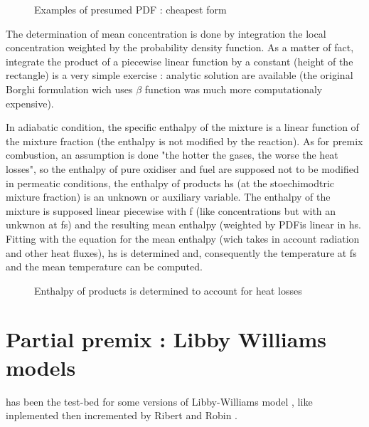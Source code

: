 \begin{figure}[h]
\caption{Examples of presumed PDF : cheapest form}
\end{figure}
The determination of mean concentration is done by integration the
local concentration weighted by the probability density function. As a
matter of fact, integrate the product of a piecewise linear function
by a constant ({\small height of the rectangle}) is a very simple
exercise : analytic solution are available ({\small the original
Borghi formulation \cite{3} wich uses $\beta$ function was much more
computationaly expensive}).

In adiabatic condition, the specific enthalpy of the mixture is a
linear function of the mixture fraction ({\small the enthalpy is not
modified by the reaction}). As for premix combustion, an assumption is
done "the hotter the gases, the worse the heat losses", so the
enthalpy of pure oxidiser and fuel are supposed not to be modified in
permeatic conditions, the enthalpy of products hs ({\small at the
stoechimodtric mixture fraction}) is an unknown or auxiliary
variable. The enthalpy of the mixture is supposed linear piecewise
with f ({\small like concentrations but with an unkwnon at fs}) and
the resulting mean enthalpy ({\small weighted by PDF}is linear in
hs. Fitting with the equation for the mean enthalpy ({\small wich
takes in account radiation and other heat fluxes}), hs is determined
and, consequently the temperature at fs and the mean temperature can
be computed.

\begin{figure}[h]
\caption{Enthalpy of products is determined to account for heat losses }
\end{figure}

\section{Partial premix : Libby Williams models}


\CS has been the test-bed for some versions of Libby-Williams model \cite{2}, like inplemented then incremented by Ribert \cite{5} and Robin \cite{6}.

